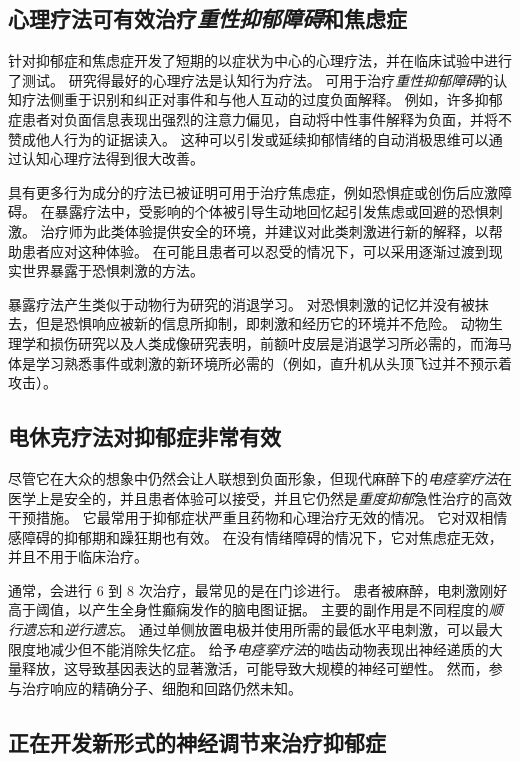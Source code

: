 \subsection{心理疗法可有效治疗\textit{重性抑郁障碍}和焦虑症}

针对抑郁症和焦虑症开发了短期的以症状为中心的心理疗法，并在临床试验中进行了测试。
研究得最好的心理疗法是认知行为疗法。
可用于治疗\textit{重性抑郁障碍}的认知疗法侧重于识别和纠正对事件和与他人互动的过度负面解释。
例如，许多抑郁症患者对负面信息表现出强烈的注意力偏见，自动将中性事件解释为负面，并将不赞成他人行为的证据读入。
这种可以引发或延续抑郁情绪的自动消极思维可以通过认知心理疗法得到很大改善。


具有更多行为成分的疗法已被证明可用于治疗焦虑症，例如恐惧症或创伤后应激障碍。
在暴露疗法中，受影响的个体被引导生动地回忆起引发焦虑或回避的恐惧刺激。
治疗师为此类体验提供安全的环境，并建议对此类刺激进行新的解释，以帮助患者应对这种体验。
在可能且患者可以忍受的情况下，可以采用逐渐过渡到现实世界暴露于恐惧刺激的方法。


暴露疗法产生类似于动物行为研究的消退学习。
对恐惧刺激的记忆并没有被抹去，但是恐惧响应被新的信息所抑制，即刺激和经历它的环境并不危险。
动物生理学和损伤研究以及人类成像研究表明，前额叶皮层是消退学习所必需的，而海马体是学习熟悉事件或刺激的新环境所必需的（例如，直升机从头顶飞过并不预示着攻击）。



\subsection{电休克疗法对抑郁症非常有效}

尽管它在大众的想象中仍然会让人联想到负面形象，但现代麻醉下的\textit{电痉挛疗法}在医学上是安全的，并且患者体验可以接受，并且它仍然是\textit{重度抑郁}急性治疗的高效干预措施。
它最常用于抑郁症状严重且药物和心理治疗无效的情况。
它对双相情感障碍的抑郁期和躁狂期也有效。
在没有情绪障碍的情况下，它对焦虑症无效，并且不用于临床治疗。


通常，会进行 6 到 8 次治疗，最常见的是在门诊进行。
患者被麻醉，电刺激刚好高于阈值，以产生全身性癫痫发作的脑电图证据。
主要的副作用是不同程度的\textit{顺行遗忘}和\textit{逆行遗忘}。
通过单侧放置电极并使用所需的最低水平电刺激，可以最大限度地减少但不能消除失忆症。
给予\textit{电痉挛疗法}的啮齿动物表现出神经递质的大量释放，这导致基因表达的显著激活，可能导致大规模的神经可塑性。
然而，参与治疗响应的精确分子、细胞和回路仍然未知。



\subsection{正在开发新形式的神经调节来治疗抑郁症}

